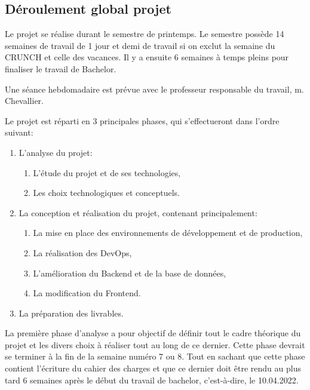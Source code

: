 \documentclass[
    iai, %
    il, %
]{heig-tb}
\begin{document}
\newpage
\subsection{Déroulement global projet}

Le projet se réalise durant le semestre de printemps. Le semestre possède 14 semaines de travail de 1 jour et demi de travail si on exclut la semaine du CRUNCH et celle des vacances.\newline
Il y a ensuite 6 semaines à temps pleins pour finaliser le travail de Bachelor.

Une séance hebdomadaire est prévue avec le professeur responsable du travail, m. Chevallier.

Le projet est réparti en 3 principales phases, qui s'effectueront dans l'ordre suivant:
\begin{enumerate}
    \def\labelenumi{\arabic{enumi}.}
    \item L'analyse du projet:
          \begin{enumerate}
              \def\labelenumii{\alph{enumii}.}
              \item L'étude du projet et de ses technologies,
              \item Les choix technologiques et conceptuels.
          \end{enumerate}
    \item La conception et réalisation du projet, contenant principalement:
          \begin{enumerate}
              \def\labelenumii{\alph{enumii}.}
              \item La mise en place des environnements de développement et de production,
              \item La réalisation des DevOps,
              \item L'amélioration du Backend et de la base de données,
              \item La modification du Frontend.
          \end{enumerate}
    \item La préparation des livrables.
\end{enumerate}

La première phase d'analyse a pour objectif de définir tout le cadre théorique du projet et les divers choix à réaliser tout au long de ce dernier.\newline
Cette phase devrait se terminer à la fin de la semaine numéro 7 ou 8.\newline
Tout en sachant que cette phase contient l'écriture du cahier des charges et que ce dernier doit être rendu au plus tard 6 semaines après le début du travail de bachelor, c'est-à-dire, le 10.04.2022.
\end{document}
